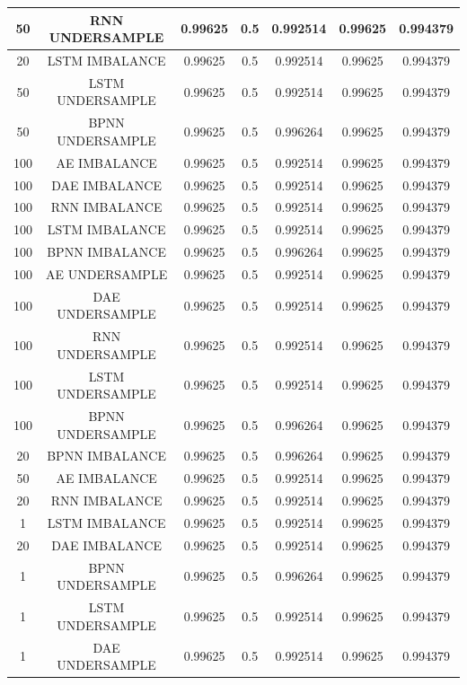 \begin{longtable}{|c|c|c|c|c|c|c|}
	50 & RNN UNDERSAMPLE & 0.99625 & 0.5 & 0.992514 & 0.99625 & 0.994379\\ \hline
	20 & LSTM IMBALANCE & 0.99625 & 0.5 & 0.992514 & 0.99625 & 0.994379\\ \hline
	50 & LSTM UNDERSAMPLE & 0.99625 & 0.5 & 0.992514 & 0.99625 & 0.994379\\ \hline
	50 & BPNN UNDERSAMPLE & 0.99625 & 0.5 & 0.996264 & 0.99625 & 0.994379\\ \hline
	100 & AE IMBALANCE & 0.99625 & 0.5 & 0.992514 & 0.99625 & 0.994379\\ \hline
	100 & DAE IMBALANCE & 0.99625 & 0.5 & 0.992514 & 0.99625 & 0.994379\\ \hline
	100 & RNN IMBALANCE & 0.99625 & 0.5 & 0.992514 & 0.99625 & 0.994379\\ \hline
	100 & LSTM IMBALANCE & 0.99625 & 0.5 & 0.992514 & 0.99625 & 0.994379\\ \hline
	100 & BPNN IMBALANCE & 0.99625 & 0.5 & 0.996264 & 0.99625 & 0.994379\\ \hline
	100 & AE UNDERSAMPLE & 0.99625 & 0.5 & 0.992514 & 0.99625 & 0.994379\\ \hline
	100 & DAE UNDERSAMPLE & 0.99625 & 0.5 & 0.992514 & 0.99625 & 0.994379\\ \hline
	100 & RNN UNDERSAMPLE & 0.99625 & 0.5 & 0.992514 & 0.99625 & 0.994379\\ \hline
	100 & LSTM UNDERSAMPLE & 0.99625 & 0.5 & 0.992514 & 0.99625 & 0.994379\\ \hline
	100 & BPNN UNDERSAMPLE & 0.99625 & 0.5 & 0.996264 & 0.99625 & 0.994379\\ \hline
	20 & BPNN IMBALANCE & 0.99625 & 0.5 & 0.996264 & 0.99625 & 0.994379\\ \hline
	50 & AE IMBALANCE & 0.99625 & 0.5 & 0.992514 & 0.99625 & 0.994379\\ \hline
	20 & RNN IMBALANCE & 0.99625 & 0.5 & 0.992514 & 0.99625 & 0.994379\\ \hline
	1 & LSTM IMBALANCE & 0.99625 & 0.5 & 0.992514 & 0.99625 & 0.994379\\ \hline
	20 & DAE IMBALANCE & 0.99625 & 0.5 & 0.992514 & 0.99625 & 0.994379\\ \hline
	1 & BPNN UNDERSAMPLE & 0.99625 & 0.5 & 0.996264 & 0.99625 & 0.994379\\ \hline
	1 & LSTM UNDERSAMPLE & 0.99625 & 0.5 & 0.992514 & 0.99625 & 0.994379\\ \hline
	1 & DAE UNDERSAMPLE & 0.99625 & 0.5 & 0.992514 & 0.99625 & 0.994379\\ \hline

\end{longtable}
